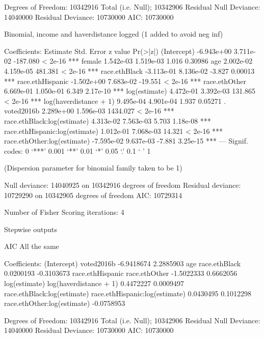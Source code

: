 Degrees of Freedom: 10342916 Total (i.e. Null);  10342906 Residual
Null Deviance:	    14040000
Residual Deviance: 10730000 	AIC: 10730000


Binomial, income and haverdistance logged (1 added to avoid neg inf)

Coefficients:
                                 Estimate Std. Error  z value Pr(>|z|)
(Intercept)                    -6.943e+00  3.711e-02 -187.080  < 2e-16 ***
female                          1.542e-03  1.519e-03    1.016  0.30986
age                             2.002e-02  4.159e-05  481.381  < 2e-16 ***
race.ethBlack                  -3.113e-01  8.136e-02   -3.827  0.00013 ***
race.ethHispanic               -1.502e+00  7.683e-02  -19.551  < 2e-16 ***
race.ethOther                   6.669e-01  1.050e-01    6.349 2.17e-10 ***
log(estimate)                   4.472e-01  3.392e-03  131.865  < 2e-16 ***
log(haverdistance + 1)          9.495e-04  4.901e-04    1.937  0.05271 .
voted2016b                      2.289e+00  1.596e-03 1434.027  < 2e-16 ***
race.ethBlack:log(estimate)     4.313e-02  7.563e-03    5.703 1.18e-08 ***
race.ethHispanic:log(estimate)  1.012e-01  7.068e-03   14.321  < 2e-16 ***
race.ethOther:log(estimate)    -7.595e-02  9.637e-03   -7.881 3.25e-15 ***
---
Signif. codes:  0 ‘***’ 0.001 ‘**’ 0.01 ‘*’ 0.05 ‘.’ 0.1 ‘ ’ 1

(Dispersion parameter for binomial family taken to be 1)

    Null deviance: 14040925  on 10342916  degrees of freedom
Residual deviance: 10729290  on 10342905  degrees of freedom
AIC: 10729314

Number of Fisher Scoring iterations: 4


Stepwise outputs

AIC All the same

Coefficients:
                   (Intercept)                      voted2016b
                    -6.9418674                       2.2885903
                           age                   race.ethBlack
                     0.0200193                      -0.3103673
              race.ethHispanic                   race.ethOther
                    -1.5022333                       0.6662056
                 log(estimate)          log(haverdistance + 1)
                     0.4472227                       0.0009497
   race.ethBlack:log(estimate)  race.ethHispanic:log(estimate)
                     0.0430495                       0.1012298
   race.ethOther:log(estimate)
                    -0.0758953

Degrees of Freedom: 10342916 Total (i.e. Null);  10342906 Residual
Null Deviance:	    14040000
Residual Deviance: 10730000 	AIC: 10730000

